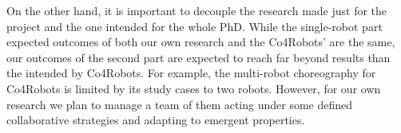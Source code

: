 On the other hand, it is important to decouple the research made just for the project and the one intended for the whole PhD.
While the single-robot part expected outcomes of both our own research and the Co4Robots' are the same, our outcomes of the second part are expected to reach far beyond results than the intended by Co4Robots.
For example, the multi-robot choreography for Co4Robots is limited by its study cases to two robots.
However, for our own research we plan to manage a team of them acting under some defined collaborative strategies and adapting to emergent properties.



